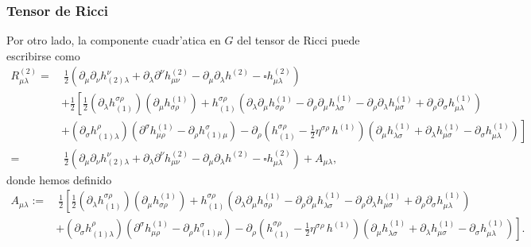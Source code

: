 \subsubsection{Tensor de Ricci}
Por otro lado, la componente cuadr'atica en $G$ del tensor de Ricci puede escribirse como
\begin{align}
R^{(2)}_{\mu\lambda} = &\ \frac{1}{2}\left(\partial_\mu\partial_\nu h^\nu_{(2)\lambda}+ \partial_\lambda \partial^\nu h^{(2)}_{\mu\nu} - \partial_\mu\partial_\lambda h^{(2)} -\square h^{(2)}_{\mu\lambda}\right) \\
& +\frac{1}{2}\left[\frac{1}{2}(\partial_\lambda h^{\sigma\rho}_{(1)})(\partial_\mu h_{\sigma\rho}^{(1)})+h^{\sigma\rho}_{(1)}\left(\partial_\lambda\partial_\mu h^{(1)}_{\sigma\rho}-\partial_\rho\partial_\mu h^{(1)}_{\lambda\sigma}-\partial_\rho\partial_\lambda h^{(1)}_{\mu\sigma}+ \partial_\rho\partial_\sigma h^{(1)}_{\mu\lambda}\right) \right.\\
& \left.+ (\partial_\sigma h^\rho_{(1)\lambda})\left(\partial^\sigma h^{(1)}_{\mu\rho}-\partial_\rho h^\sigma_{(1)\mu}\right) -\partial_\rho\left(h^{\sigma\rho}_{(1)}-\frac{1}{2}\eta^{\sigma\rho}\,h^{(1)}\right)\left(\partial_\mu h^{(1)}_{\lambda\sigma}+\partial_\lambda h^{(1)}_{\mu\sigma}-\partial_\sigma h^{(1)}_{\mu\lambda}\right) \right]\\
=&\ \frac{1}{2}\left(\partial_\mu\partial_\nu h^\nu_{(2)\lambda}+ \partial_\lambda \partial^\nu h^{(2)}_{\mu\nu} - \partial_\mu\partial_\lambda h^{(2)} -\square h^{(2)}_{\mu\lambda}\right) +A_{\mu\lambda},
\end{align}
donde hemos definido
\begin{align}
A_{\mu\lambda} := & \ \frac{1}{2}\left[\frac{1}{2}(\partial_\lambda h^{\sigma\rho}_{(1)})
(\partial_\mu h_{\sigma\rho}^{(1)})+h^{\sigma\rho}_{(1)}
\left(\partial_\lambda\partial_\mu h^{(1)}_{\sigma\rho}-\partial_\rho\partial_\mu
h^{(1)}_{\lambda\sigma}-\partial_\rho\partial_\lambda h^{(1)}_{\mu\sigma}
+ \partial_\rho\partial_\sigma h^{(1)}_{\mu\lambda}\right) \right. \nonumber\\
& + \left.  (\partial_\sigma h^\rho_{(1)\lambda})\left(\partial^\sigma h^{(1)}_{\mu\rho}-\partial_\rho h^\sigma_{(1)\mu}\right) -\partial_\rho\left(h^{\sigma\rho}_{(1)}-\frac{1}{2}\eta^{\sigma\rho}\,h^{(1)}\right)\left(\partial_\mu h^{(1)}_{\lambda\sigma}+\partial_\lambda h^{(1)}_{\mu\sigma}-\partial_\sigma h^{(1)}_{\mu\lambda}\right) \right]. \label{defAmn}
\end{align}

